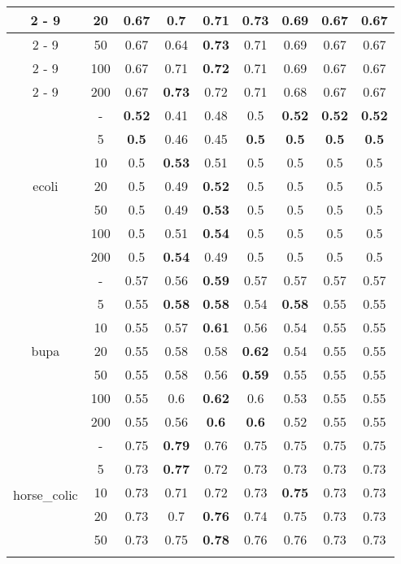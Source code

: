 \documentclass{article}%
\begin{document}
\begin{longtable}{c|c|ccccccc}
\cline{2%
-%
9}%
&20&0.67&0.7&0.71&\textbf{0.73}&0.69&0.67&0.67\\%
\cline{2%
-%
9}%
&50&0.67&0.64&\textbf{0.73}&0.71&0.69&0.67&0.67\\%
\cline{2%
-%
9}%
&100&0.67&0.71&\textbf{0.72}&0.71&0.69&0.67&0.67\\%
\cline{2%
-%
9}%
&200&0.67&\textbf{0.73}&0.72&0.71&0.68&0.67&0.67\\%
\hline%
\multirow{7}{*}{ecoli}&{-}&\textbf{0.52}&0.41&0.48&0.5&\textbf{0.52}&\textbf{0.52}&\textbf{0.52}\\%
\cline{2%
-%
9}%
&5&\textbf{0.5}&0.46&0.45&\textbf{0.5}&\textbf{0.5}&\textbf{0.5}&\textbf{0.5}\\%
\cline{2%
-%
9}%
&10&0.5&\textbf{0.53}&0.51&0.5&0.5&0.5&0.5\\%
\cline{2%
-%
9}%
&20&0.5&0.49&\textbf{0.52}&0.5&0.5&0.5&0.5\\%
\cline{2%
-%
9}%
&50&0.5&0.49&\textbf{0.53}&0.5&0.5&0.5&0.5\\%
\cline{2%
-%
9}%
&100&0.5&0.51&\textbf{0.54}&0.5&0.5&0.5&0.5\\%
\cline{2%
-%
9}%
&200&0.5&\textbf{0.54}&0.49&0.5&0.5&0.5&0.5\\%
\hline%
\multirow{7}{*}{bupa}&{-}&0.57&0.56&\textbf{0.59}&0.57&0.57&0.57&0.57\\%
\cline{2%
-%
9}%
&5&0.55&\textbf{0.58}&\textbf{0.58}&0.54&\textbf{0.58}&0.55&0.55\\%
\cline{2%
-%
9}%
&10&0.55&0.57&\textbf{0.61}&0.56&0.54&0.55&0.55\\%
\cline{2%
-%
9}%
&20&0.55&0.58&0.58&\textbf{0.62}&0.54&0.55&0.55\\%
\cline{2%
-%
9}%
&50&0.55&0.58&0.56&\textbf{0.59}&0.55&0.55&0.55\\%
\cline{2%
-%
9}%
&100&0.55&0.6&\textbf{0.62}&0.6&0.53&0.55&0.55\\%
\cline{2%
-%
9}%
&200&0.55&0.56&\textbf{0.6}&\textbf{0.6}&0.52&0.55&0.55\\%
\hline%
\multirow{7}{*}{horse\_colic}&{-}&0.75&\textbf{0.79}&0.76&0.75&0.75&0.75&0.75\\%
\cline{2%
-%
9}%
&5&0.73&\textbf{0.77}&0.72&0.73&0.73&0.73&0.73\\%
\cline{2%
-%
9}%
&10&0.73&0.71&0.72&0.73&\textbf{0.75}&0.73&0.73\\%
\cline{2%
-%
9}%
&20&0.73&0.7&\textbf{0.76}&0.74&0.75&0.73&0.73\\%
\cline{2%
-%
9}%
&50&0.73&0.75&\textbf{0.78}&0.76&0.76&0.73&0.73\\%
\cline{2%
-%
}
\end{longtable}
\end{document}

